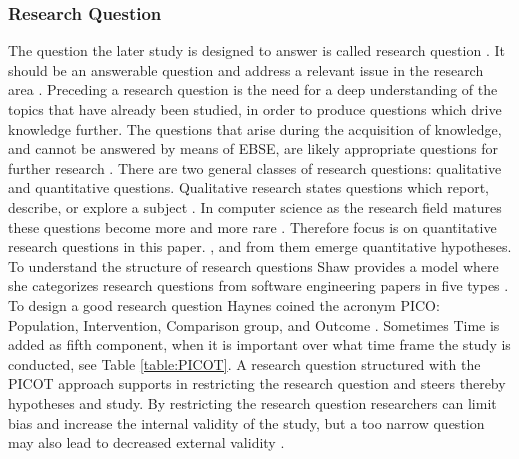 \subsubsection{Research Question}

The question the later study is designed to answer is called research question \cite{Vickers}. It should be an answerable question and address a relevant issue in the research area \cite{Dyba2005}. Preceding a research question is the need for a deep understanding of the topics that have already been studied, in order to produce questions which drive knowledge further. The questions that arise during the acquisition of knowledge, and cannot be answered by means of EBSE, are likely appropriate questions for further research \cite{Farrugia2009}. \newline
There are two general classes of research questions: qualitative and quantitative questions. Qualitative research states questions which report, describe, or explore a subject \cite[p. 139-141]{Creswell2014}. In computer science as the research field matures these questions become more and more rare . Therefore focus is on quantitative research questions in this paper.  \cite[p. 143]{Creswell2014}, and from them emerge quantitative hypotheses. \newline
To understand the structure of research questions Shaw provides a model where she categorizes research questions from software engineering papers in five types \cite{Shaw2002} . \newline
To design a good research question Haynes coined the acronym PICO: Population, Intervention, Comparison group, and Outcome \cite{BrianHaynes2006}. Sometimes Time is added as fifth component, when it is important over what time frame the study is conducted, see Table \ref{table:PICOT}. A research question structured with the PICOT approach supports in restricting the research question and steers thereby hypotheses and study. By restricting the research question researchers can limit bias and increase the internal validity of the study, but a too narrow question may also lead to decreased external validity \cite{Farrugia2009}. \\

